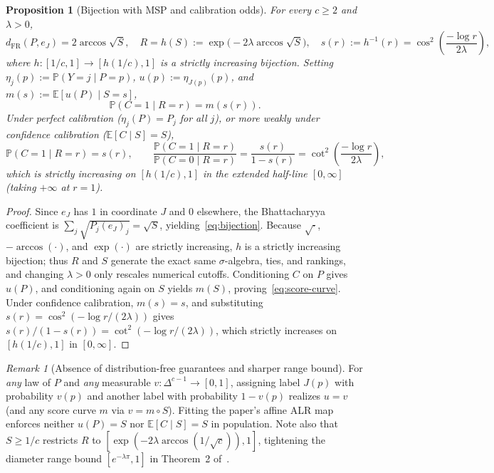 \documentclass[11pt]{article}
\theoremstyle{plain}
\newtheorem{proposition}[theorem]{Proposition}
\theoremstyle{definition}
\theoremstyle{remark}
\newtheorem{remark}{Remark}
\newcommand{\dFR}{d_{\mathrm{FR}}}
\begin{document}
\begin{proposition}[Bijection with MSP and calibration odds]\label{prop:bijection}
For every $c \ge 2$ and $\lambda > 0$,
\begin{equation}\label{eq:bijection}
\dFR(P, e_J) = 2\arccos\sqrt{S}, \quad
R = h(S) := \exp\bigl(-2\lambda\arccos\sqrt{S}\bigr), \quad
s(r) := h^{-1}(r) = \cos^2\!\left(\frac{-\log r}{2\lambda}\right),
\end{equation}
where $h : [1/c, 1] \to [h(1/c), 1]$ is a strictly increasing bijection. Setting $\eta_j(p) := \mathbb{P}(Y = j \mid P = p)$, $u(p) := \eta_{J(p)}(p)$, and $m(s) := \mathbb{E}[u(P) \mid S = s]$,
\begin{equation}\label{eq:score-curve}
\mathbb{P}(C = 1 \mid R = r) = m(s(r)).
\end{equation}
Under perfect calibration ($\eta_j(P) = P_j$ for all $j$), or more weakly under confidence calibration ($\mathbb{E}[C \mid S] = S$),
\begin{equation}\label{eq:cal-odds}
\mathbb{P}(C = 1 \mid R = r) = s(r), \qquad
\frac{\mathbb{P}(C = 1 \mid R = r)}{\mathbb{P}(C = 0 \mid R = r)}
= \frac{s(r)}{1 - s(r)}
= \cot^2\!\left(\frac{-\log r}{2\lambda}\right),
\end{equation}
which is strictly increasing on $[h(1/c), 1]$ in the extended half-line $[0, \infty]$ (taking $+\infty$ at $r = 1$).
\end{proposition}

\begin{proof}
Since $e_J$ has $1$ in coordinate $J$ and $0$ elsewhere, the Bhattacharyya coefficient is $\sum_j \sqrt{P_j (e_J)_j} = \sqrt{S}$, yielding~\eqref{eq:bijection}. Because $\sqrt{\cdot}$, $-\arccos(\cdot)$, and $\exp(\cdot)$ are strictly increasing, $h$ is a strictly increasing bijection; thus $R$ and $S$ generate the exact same $\sigma$-algebra, ties, and rankings, and changing $\lambda > 0$ only rescales numerical cutoffs. Conditioning $C$ on $P$ gives $u(P)$, and conditioning again on $S$ yields $m(S)$, proving~\eqref{eq:score-curve}. Under confidence calibration, $m(s) = s$, and substituting $s(r) = \cos^2(-\log r / (2\lambda))$ gives $s(r)/(1 - s(r)) = \cot^2(-\log r / (2\lambda))$, which strictly increases on $[h(1/c), 1]$ in $[0, \infty]$.
\end{proof}

\begin{remark}[Absence of distribution-free guarantees and sharper range bound]
For \emph{any} law of $P$ and \emph{any} measurable $v : \Delta^{c-1} \to [0, 1]$, assigning label $J(p)$ with probability $v(p)$ and another label with probability $1 - v(p)$ realizes $u = v$ (and any score curve $m$ via $v = m \circ S$). Fitting the paper's affine ALR map enforces neither $u(P) = S$ nor $\mathbb{E}[C \mid S] = S$ in population. Note also that $S \ge 1/c$ restricts $R$ to $[\exp(-2\lambda\arccos(1/\sqrt{c})), 1]$, tightening the diameter range bound $[e^{-\lambda\pi}, 1]$ in Theorem~2 of~\cite{Das2025}.
\end{remark}
\end{document}
